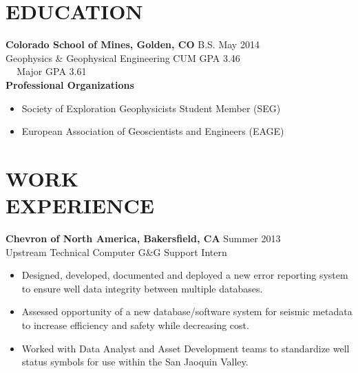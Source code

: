 \documentclass[margin]{res}
\begin{document}
  
\address{1221 Illinois Street Apt. 2E \\ Golden, CO 80401 \\ (360) 813-2795 \\ ckohnke@mines.edu }

\begin{resume}                        

\section{EDUCATION} \textbf{Colorado School of Mines, Golden, CO} \hfill B.S. May 2014 \\
                Geophysics \& Geophysical Engineering \hfill CUM GPA 3.46 \\
                \textcolor{white}{...} \hfill Major GPA 3.61 \\
                \textbf{Professional Organizations}
                \begin{itemize}
                 \item Society of Exploration Geophysicists Student Member (SEG)
                 \item European Association of Geoscientists and Engineers (EAGE)
                \end{itemize}

\section{WORK \\ EXPERIENCE}
			\textbf{Chevron of North America, Bakersfield, CA} \hfill Summer 2013 \\
			Upstream Technical Computer G{\&}G Support Intern
		  		\begin{itemize}
		  		\item Designed, developed, documented and deployed a new error reporting system to ensure well data integrity between 						multiple databases.
		  		\item Assessed opportunity of a new database/software system for seismic metadata to increase efficiency and safety while decreasing cost.
		  		\item Worked with Data Analyst and Asset Development teams to standardize well status symbols for use within the San Jaoquin Valley.
		  		\end{itemize}
		  		

\end{resume}
\end{document}
